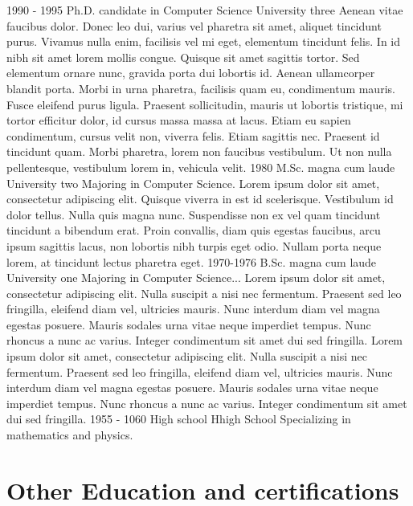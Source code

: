 \documentclass[letterpaper]{twentyonesecondcv} %
\begin{document}
{    \begin{twenty}
      \twentyitem
        {1990 - 1995}
        {Ph.D. {\normalfont candidate in Computer Science}}
        {University three}
        {Aenean vitae faucibus dolor. Donec leo dui, varius vel pharetra sit amet, aliquet tincidunt purus. Vivamus nulla enim, facilisis vel mi eget, elementum tincidunt felis. In id nibh sit amet lorem mollis congue. Quisque sit amet sagittis tortor. Sed elementum ornare nunc, gravida porta dui lobortis id. Aenean ullamcorper blandit porta. Morbi in urna pharetra, facilisis quam eu, condimentum mauris. Fusce eleifend purus ligula. Praesent sollicitudin, mauris ut lobortis tristique, mi tortor efficitur dolor, id cursus massa massa at lacus. Etiam eu sapien condimentum, cursus velit non, viverra felis. Etiam sagittis nec. Praesent id tincidunt quam. Morbi pharetra, lorem non faucibus vestibulum. Ut non nulla pellentesque, vestibulum lorem in, vehicula velit.}
      \twentyitem
        {1980}
        {M.Sc. magna cum laude}
        {University two}
        {Majoring in Computer Science. Lorem ipsum dolor sit amet, consectetur adipiscing elit. Quisque viverra in est id scelerisque. Vestibulum id dolor tellus. Nulla quis magna nunc. Suspendisse non ex vel quam tincidunt tincidunt a bibendum erat. Proin convallis, diam quis egestas faucibus, arcu ipsum sagittis lacus, non lobortis nibh turpis eget odio. Nullam porta neque lorem, at tincidunt lectus pharetra eget.}
      \twentyitem
        {1970-1976}
        {B.Sc. magna cum laude}
        {University one}
        {Majoring in Computer Science... Lorem ipsum dolor sit amet, consectetur adipiscing elit. Nulla suscipit a nisi nec fermentum. Praesent sed leo fringilla, eleifend diam vel, ultricies mauris. Nunc interdum diam vel magna egestas posuere. Mauris sodales urna vitae neque imperdiet tempus. Nunc rhoncus a nunc ac varius. Integer condimentum sit amet dui sed fringilla. Lorem ipsum dolor sit amet, consectetur adipiscing elit. Nulla suscipit a nisi nec fermentum. Praesent sed leo fringilla, eleifend diam vel, ultricies mauris. Nunc interdum diam vel magna egestas posuere. Mauris sodales urna vitae neque imperdiet tempus. Nunc rhoncus a nunc ac varius. Integer condimentum sit amet dui sed fringilla.}
      \twentyitem
        {1955 - 1060}
        {High school}
        {Hhigh School}
        {Specializing in mathematics and physics.}
    \end{twenty}
    
    \section{Other Education and certifications}
    
}
\end{document}
